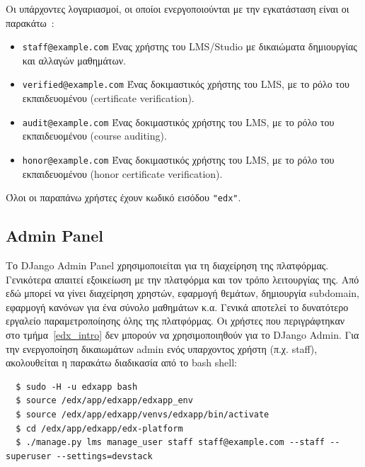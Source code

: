\documentclass[12pt]{report}
\begin{document}
Οι υπάρχοντες λογαριασμοί, οι οποίοι ενεργοποιούνται με την εγκατάσταση είναι οι παρακάτω~\cite{confluence_2}:
\begin{itemize}
  \item \textlatin{\texttt{staff@example.com}} Ένας χρήστης του \textlatin{LMS/Studio} με δικαιώματα δημιουργίας και αλλαγών μαθημάτων.
  \item \textlatin{\texttt{verified@example.com}} Ένας δοκιμαστικός χρήστης του \textlatin{LMS}, με το ρόλο του εκπαιδευομένου (\textlatin{certificate verification}).
  \item \textlatin{\texttt{audit@example.com}} Ένας δοκιμαστικός χρήστης του \textlatin{LMS}, με το ρόλο του εκπαιδευομένου (\textlatin{course auditing}).
  \item \textlatin{\texttt{honor@example.com}} Ένας δοκιμαστικός χρήστης του \textlatin{LMS}, με το ρόλο του εκπαιδευομένου (\textlatin{honor certificate verification}).
\end{itemize}

Όλοι οι παραπάνω χρήστες έχουν κωδικό εισόδου \textlatin{\texttt{"edx"}}.

\subsection{\textlatin{Admin Panel}}\label{edx_panel}
Το \textlatin{DJango Admin Panel} χρησιμοποιείται για τη διαχείρηση της πλατφόρμας. Γενικότερα απαιτεί εξοικείωση με την πλατφόρμα και τον τρόπο λειτουργίας της. Από εδώ μπορεί να γίνει διαχείρηση χρηστών, εφαρμογή θεμάτων, δημιουργία \textlatin{subdomain}, εφαρμογή κανόνων για ένα σύνολο μαθημάτων κ.α. Γενικά αποτελεί το δυνατότερο εργαλείο παραμετροποίησης όλης της πλατφόρμας. Οι χρήστες που περιγράφτηκαν στο τμήμα~\ref{edx_intro} δεν μπορούν να χρησιμοποιηθούν για το \textlatin{DJango Admin}. Για την ενεργοποίηση δικαιωμάτων \textlatin{admin} ενός υπαρχοντος χρήστη (π.χ. \textlatin{staff}), ακολουθείται η παρακάτω διαδικασία από το \textlatin{bash shell}:
\begin{Verbatim}
  $ sudo -H -u edxapp bash
  $ source /edx/app/edxapp/edxapp_env
  $ source /edx/app/edxapp/venvs/edxapp/bin/activate
  $ cd /edx/app/edxapp/edx-platform
  $ ./manage.py lms manage_user staff staff@example.com --staff --superuser --settings=devstack
\end{Verbatim}
\end{document}
